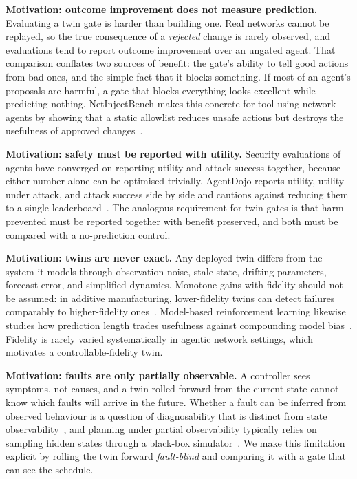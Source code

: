 \documentclass[conference]{IEEEtran}
\begin{document}
\textbf{Motivation: outcome improvement does not measure prediction.} Evaluating a twin gate is harder than building one. Real networks cannot be replayed, so the true consequence of a \emph{rejected} change is rarely observed, and evaluations tend to report outcome improvement over an ungated agent. That comparison conflates two sources of benefit: the gate's ability to tell good actions from bad ones, and the simple fact that it blocks something. If most of an agent's proposals are harmful, a gate that blocks everything looks excellent while predicting nothing. NetInjectBench makes this concrete for tool-using network agents by showing that a static allowlist reduces unsafe actions but destroys the usefulness of approved changes~\cite{netinjectbench}.

\textbf{Motivation: safety must be reported with utility.} Security evaluations of agents have converged on reporting utility and attack success together, because either number alone can be optimised trivially. AgentDojo reports utility, utility under attack, and attack success side by side and cautions against reducing them to a single leaderboard~\cite{agentdojo}. The analogous requirement for twin gates is that harm prevented must be reported together with benefit preserved, and both must be compared with a no-prediction control.

\textbf{Motivation: twins are never exact.} Any deployed twin differs from the system it models through observation noise, stale state, drifting parameters, forecast error, and simplified dynamics. Monotone gains with fidelity should not be assumed: in additive manufacturing, lower-fidelity twins can detect failures comparably to higher-fidelity ones~\cite{fidelityam}. Model-based reinforcement learning likewise studies how prediction length trades usefulness against compounding model bias~\cite{mbpo}. Fidelity is rarely varied systematically in agentic network settings, which motivates a controllable-fidelity twin.

\textbf{Motivation: faults are only partially observable.} A controller sees symptoms, not causes, and a twin rolled forward from the current state cannot know which faults will arrive in the future. Whether a fault can be inferred from observed behaviour is a question of diagnosability that is distinct from state observability~\cite{sampath}, and planning under partial observability typically relies on sampling hidden states through a black-box simulator~\cite{pomcp}. We make this limitation explicit by rolling the twin forward \emph{fault-blind} and comparing it with a gate that can see the schedule.
\end{document}
